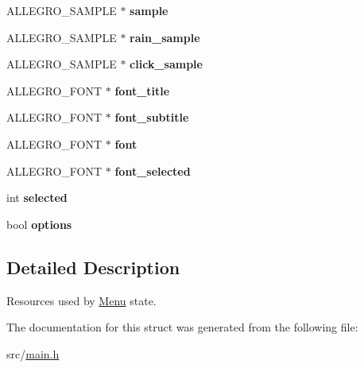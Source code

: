 \begin{DoxyCompactItemize}
\item 
\hypertarget{structMenu_a19a25811d2d08b8fa1d1819088168b72}{\-A\-L\-L\-E\-G\-R\-O\-\_\-\-S\-A\-M\-P\-L\-E $\ast$ {\bfseries sample}}\label{structMenu_a19a25811d2d08b8fa1d1819088168b72}

\item 
\hypertarget{structMenu_a950842dbb6e1ad716e71c5f0792e9227}{\-A\-L\-L\-E\-G\-R\-O\-\_\-\-S\-A\-M\-P\-L\-E $\ast$ {\bfseries rain\-\_\-sample}}\label{structMenu_a950842dbb6e1ad716e71c5f0792e9227}

\item 
\hypertarget{structMenu_a7db926611a6bd647e7704e7592eea42d}{\-A\-L\-L\-E\-G\-R\-O\-\_\-\-S\-A\-M\-P\-L\-E $\ast$ {\bfseries click\-\_\-sample}}\label{structMenu_a7db926611a6bd647e7704e7592eea42d}

\item 
\hypertarget{structMenu_aac0297cac51099ec75020a510a6dcbb3}{\-A\-L\-L\-E\-G\-R\-O\-\_\-\-F\-O\-N\-T $\ast$ {\bfseries font\-\_\-title}}\label{structMenu_aac0297cac51099ec75020a510a6dcbb3}

\item 
\hypertarget{structMenu_ab08bf7d95cd23aacafe9db09de6024d2}{\-A\-L\-L\-E\-G\-R\-O\-\_\-\-F\-O\-N\-T $\ast$ {\bfseries font\-\_\-subtitle}}\label{structMenu_ab08bf7d95cd23aacafe9db09de6024d2}

\item 
\hypertarget{structMenu_a85601622ac6501a8a4bd6347ebcb0cbf}{\-A\-L\-L\-E\-G\-R\-O\-\_\-\-F\-O\-N\-T $\ast$ {\bfseries font}}\label{structMenu_a85601622ac6501a8a4bd6347ebcb0cbf}

\item 
\hypertarget{structMenu_a58e06d2580687e32e6a44c95b28076f3}{\-A\-L\-L\-E\-G\-R\-O\-\_\-\-F\-O\-N\-T $\ast$ {\bfseries font\-\_\-selected}}\label{structMenu_a58e06d2580687e32e6a44c95b28076f3}

\item 
\hypertarget{structMenu_a608e2768a5458057048bf1c7ab9a81aa}{int {\bfseries selected}}\label{structMenu_a608e2768a5458057048bf1c7ab9a81aa}

\item 
\hypertarget{structMenu_a239080567caece4982b2edd716c57223}{bool {\bfseries options}}\label{structMenu_a239080567caece4982b2edd716c57223}

\end{DoxyCompactItemize}


\subsection{\-Detailed \-Description}
\-Resources used by \hyperlink{structMenu}{\-Menu} state. 

\-The documentation for this struct was generated from the following file\-:\begin{DoxyCompactItemize}
\item 
src/\hyperlink{main_8h}{main.\-h}\end{DoxyCompactItemize}

